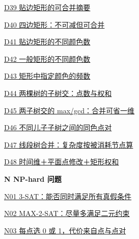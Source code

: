 \documentclass[10pt,a4paper]{article}
\begin{document}
\noindent\hyperref[D39]{D39 贴边矩形的可合并摘要\nobreak\hfill\pageref*{D39}}\par\vspace{1.5pt}
\noindent\hyperref[D40]{D40 四边矩形：不可减但可合并\nobreak\hfill\pageref*{D40}}\par\vspace{1.5pt}
\noindent\hyperref[D41]{D41 贴边矩形的不同颜色数\nobreak\hfill\pageref*{D41}}\par\vspace{1.5pt}
\noindent\hyperref[D42]{D42 一般矩形的不同颜色数\nobreak\hfill\pageref*{D42}}\par\vspace{1.5pt}
\noindent\hyperref[D43]{D43 矩形中指定颜色的频数\nobreak\hfill\pageref*{D43}}\par\vspace{1.5pt}
\noindent\hyperref[D44]{D44 两棵树的子树交：点数与权和\nobreak\hfill\pageref*{D44}}\par\vspace{1.5pt}
\noindent\hyperref[D45]{D45 两子树交的 max/gcd：合并可省一维\nobreak\hfill\pageref*{D45}}\par\vspace{1.5pt}
\noindent\hyperref[D46]{D46 不同儿子子树之间的同色点对\nobreak\hfill\pageref*{D46}}\par\vspace{1.5pt}
\noindent\hyperref[D47]{D47 线段树合并：复杂度按被消耗节点算\nobreak\hfill\pageref*{D47}}\par\vspace{1.5pt}
\noindent\hyperref[D48]{D48 时间维＋平面点修改＋矩形权和\nobreak\hfill\pageref*{D48}}\par\vspace{1.5pt}
\par\vspace{6pt}\textbf{N NP-hard 问题}\par\vspace{3pt}
\noindent\hyperref[N01]{N01 3-SAT：能否同时满足所有真假条件\nobreak\hfill\pageref*{N01}}\par\vspace{1.5pt}
\noindent\hyperref[N02]{N02 MAX-2-SAT：尽量多满足二元约束\nobreak\hfill\pageref*{N02}}\par\vspace{1.5pt}
\noindent\hyperref[N03]{N03 每点选 0 或 1，代价来自点与点对\nobreak\hfill\pageref*{N03}}\par\vspace{1.5pt}
\end{document}
